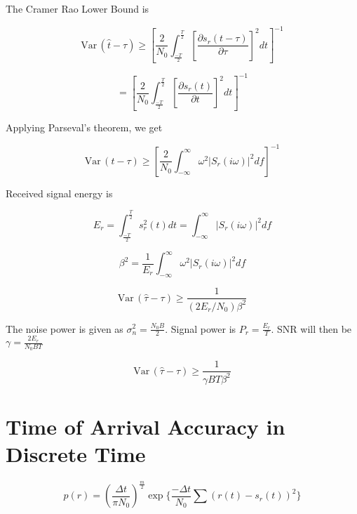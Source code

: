 \documentclass[11pt]{article}
\def\Var{{\textrm{Var}}\,}
\begin{document}
The Cramer Rao Lower Bound is

\begin{equation}
\Var(\hat{t} - \tau)
\geq
\left[
\frac{2}{N_0}
\int^\frac{T}{2}_\frac{-T}{2} \left[ \frac{\partial s_r(t-\tau)}{\partial \tau} \right]^2 dt \right]^{-1}
\end{equation}


\begin{equation}
= \left[ \frac{2}{N_0} \int^\frac{T}{2}_\frac{-T}{2} \left[ \frac{\partial s_r(t)}{\partial t} \right]^2 dt \right]^{-1}
\end{equation}

Applying Parseval's theorem, we get

\begin{equation}
\Var(t-\tau)
\geq
\left[ \frac{2}{N_0} \int^{\infty}_{-\infty} \omega^2 |S_r(i\omega )|^2 df \right]^{-1}
\end{equation}

Received signal energy is

\begin{equation}
E_r = \int^\frac{T}{2}_\frac{-T}{2} s_r^2(t)dt = \int^\infty_{-\infty} |S_r(i\omega)|^2 df
\end{equation}

\begin{equation}
\beta^2 = \frac{1}{E_r} \int^\infty_{-\infty} \omega^2 |S_r(i\omega)|^2 df
\end{equation}

\begin{equation}
\Var(\hat{\tau} - \tau)
\geq
\frac{1}{(2E_r/N_0)\beta^2}
\end{equation}

The noise power is given as $\sigma_n^2 = \frac{N_0B}{2}$. Signal power is $P_r = \frac{E_r}{T}$. SNR will then be $\gamma = \frac{2E_r}{N_0BT}$

\begin{equation}
\boxed{
\Var(\hat{\tau} - \tau)
\geq
\frac{1}{\gamma BT\beta^2}
}
\end{equation}


\section{Time of Arrival Accuracy in Discrete Time}

\begin{equation}
p(r) = \left( \frac{\Delta t}{\pi N_0}\right)^{\frac{m}{2}}
\exp \{ \frac{-\Delta t}{N_0} \sum (r(t) - s_r(t))^2\}
\end{equation}
\end{document}
